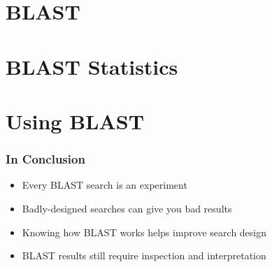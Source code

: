 \section{BLAST}
  
  
  
  

\section{BLAST Statistics}
   
  
  
\section{Using BLAST}
  
  
  
  

\begin{frame}
  \frametitle{In Conclusion}
  \begin{itemize}
    \item Every BLAST search is an experiment
    \item Badly-designed searches can give you bad results
    \item Knowing how BLAST works helps improve search design
    \item BLAST results still require inspection and interpretation
  \end{itemize}
\end{frame}     
    


